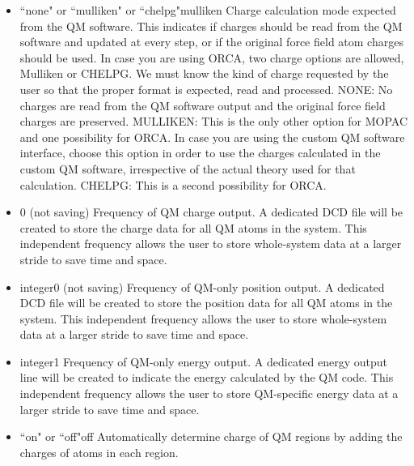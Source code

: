 \begin{itemize}
\item
{}%
{``none" or ``mulliken" or ``chelpg"}{mulliken}{%
Charge calculation mode expected from the QM software. This
indicates if charges should be read from the QM software and
updated at every step, or if the original force field atom
charges should be used. In case you are using ORCA, two charge
options are allowed, Mulliken or CHELPG. We must know the kind
of charge requested by the user so that the proper format is expected,
read and processed. NONE: No charges are read from the QM software
output and the original force field charges are preserved.
MULLIKEN: This is the only other option for MOPAC and one possibility
for ORCA. In case you are using the custom QM software interface,
choose this option in order to use the charges calculated in the
custom QM software, irrespective of the actual theory used for
that calculation. CHELPG: This is a second possibility for ORCA.
}

\item
{}%
{0 (not saving)}{%
Frequency of QM charge output. A dedicated DCD file will be created
to store the charge data for all QM atoms in the system. This
independent frequency allows the user to store whole-system data
at a larger stride to save time and space.
}

\item
{}%
{integer}{0 (not saving)}{%
Frequency of QM-only position output. A dedicated DCD file will be
created to store the position data for all QM atoms in the system.
This independent frequency allows the user to store whole-system
data at a larger stride to save time and space.
}

\item
{}%
{integer}{1}{%
Frequency of QM-only energy output. A dedicated energy output line will be 
created to indicate the energy calculated by the QM code.
This independent frequency allows the user to store QM-specific energy 
data at a larger stride to save time and space.
}

\item
{}%
{``on" or ``off"}{off}{%
Automatically determine charge of QM regions by adding the charges of 
atoms in each region.
}


\end{itemize}
